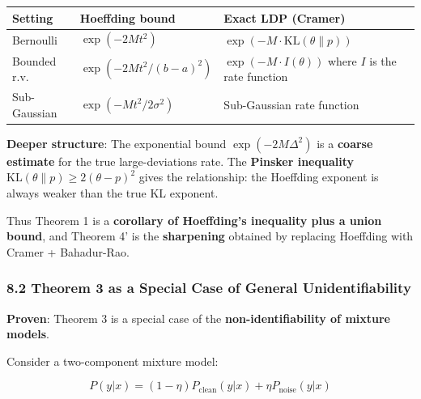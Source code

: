 \documentclass[
  12pt,
]{ctexart}
\begin{document}
\begin{longtable}[]{@{}
  >{\raggedright\arraybackslash}p{}
  >{\raggedright\arraybackslash}p{}
  >{\raggedright\arraybackslash}p{}@{}}
\toprule\noalign{}
\begin{minipage}[b]{\linewidth}\raggedright
Setting
\end{minipage} & \begin{minipage}[b]{\linewidth}\raggedright
Hoeffding bound
\end{minipage} & \begin{minipage}[b]{\linewidth}\raggedright
Exact LDP (Cramer)
\end{minipage} \\
\midrule\noalign{}
\endhead
\bottomrule\noalign{}
\endlastfoot
Bernoulli & \(\exp(-2Mt^2)\) &
\(\exp(-M \cdot \text{KL}(\theta\|p))\) \\
Bounded r.v. & \(\exp(-2Mt^2 / (b-a)^2)\) & \(\exp(-M \cdot I(\theta))\)
where \(I\) is the rate function \\
Sub-Gaussian & \(\exp(-Mt^2 / 2\sigma^2)\) & Sub-Gaussian rate
function \\
\end{longtable}

\textbf{Deeper structure}: The exponential bound \(\exp(-2M\Delta^2)\)
is a \textbf{coarse estimate} for the true large-deviations rate. The
\textbf{Pinsker inequality} \(\text{KL}(\theta\|p) \geq 2(\theta-p)^2\)
gives the relationship: the Hoeffding exponent is always weaker than the
true KL exponent.

Thus Theorem 1 is a \textbf{corollary of Hoeffding's inequality plus a
union bound}, and Theorem 4' is the \textbf{sharpening} obtained by
replacing Hoeffding with Cramer + Bahadur-Rao.

\subsubsection{8.2 Theorem 3 as a Special Case of General
Unidentifiability}\label{theorem-3-as-a-special-case-of-general-unidentifiability}

\textbf{Proven}: Theorem 3 is a special case of the
\textbf{non-identifiability of mixture models}.

Consider a two-component mixture model:

\[P(y | x) = (1-\eta)P_{\text{clean}}(y | x) + \eta P_{\text{noise}}(y | x)\]
\end{document}
